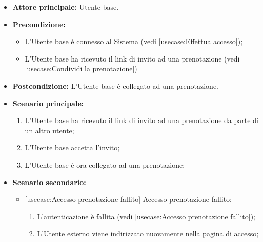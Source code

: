 \label{usecase:Accedi alla prenotazione}
\begin{itemize}
	\item \textbf{Attore principale:} Utente base.

	\item \textbf{Precondizione:} 
	\begin{itemize}
		\item L'Utente base è connesso al Sistema (vedi \autoref{usecase:Effettua accesso});
		\item L'Utente base ha ricevuto il link di invito ad una prenotazione (vedi \autoref{usecase:Condividi la prenotazione})
	\end{itemize}
		

	\item \textbf{Postcondizione:} L'Utente base è collegato ad una prenotazione.

	\item \textbf{Scenario principale:}
	      \begin{enumerate}
		      \item L'Utente base ha ricevuto il link di invito ad una prenotazione da parte di un altro utente;
		      \item L'Utente base accetta l'invito;
		      \item L'Utente base è ora collegato ad una prenotazione;
	      \end{enumerate}

	\item \textbf{Scenario secondario:}
		  \begin{itemize}
			  \item \autoref{usecase:Accesso prenotazione fallito} Accesso prenotazione fallito:
			  \begin{enumerate}
				  \item L'autenticazione è fallita (vedi \autoref{usecase:Accesso prenotazione fallito});
				  \item L'Utente esterno viene indirizzato nuovamente nella pagina di accesso; 
			  \end{enumerate}	
		  \end{itemize}
\end{itemize}
